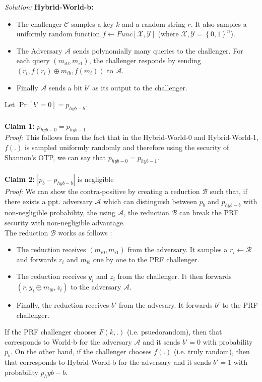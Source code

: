 \documentclass[a4paper, 11pt]{article}
\newenvironment{solution}
    {\textit{Solution:}}
    {\clearpage}
\newcommand{\bit}{\left\{0, 1\right\}}
\newcommand{\calA}{\mathcal{A}}
\newcommand{\calB}{\mathcal{B}}
\newcommand{\calC}{\mathcal{C}}
\newcommand{\calX}{\mathcal{X}}
\newcommand{\calY}{\mathcal{Y}}
\newcommand{\calR}{\mathcal{R}}
\begin{document}
\begin{solution}
    \textbf{Hybrid-World-b:}
    \begin{itemize}
        \item The challenger $\calC$ samples a key $k$ and a random string $r$. It also samples a uniformly random function $f \leftarrow Func[\calX, \calY]$ (where $\calX, \calY = \bit^n$).
        \item The Adversary $\calA$ sends polynomially many queries to the challenger. For each query $(m_{i0}, m_{i1})$, the challenger responds by sending $(r_i, f(r_i) \oplus m_{ib}, f(m_i))$ to $\calA$.
        \item Finally $\calA$ sends a bit $b'$ as its output to the challenger.
    \end{itemize}
    Let $\Pr[b' = 0] = p_{hyb-b}$. \\ \\
    \textbf{Claim 1:} $p_{hyb-0} = p_{hyb-1}$ \\
    \textit{Proof:} This follows from the fact that in the Hybrid-World-0 and Hybrid-World-1, $f(.)$ is sampled uniformly randomly and therefore using the security of Shannon's OTP, we can say that $p_{hyb-0} = p_{hyb-1}$.\\ \\
    \textbf{Claim 2:} $| p_{b} - p_{hyb-b} |$ is negligible \\
    \textit{Proof:} We can show the contra-positive by creating a reduction $\calB$ such that, if there exists a ppt. adversary $\calA$ which can distinguish between $p_{b}$ and $p_{hyb-b}$ with non-negligible probability, the using $\calA$, the reduction $\calB$ can break the PRF security with non-negligible advantage.\\
    The reduction $\calB$ works as follows :
    \begin{itemize}
        \item The reduction receives $(m_{i0}, m_{i1})$ from the adversary. It samples a $r_i \leftarrow \calR$ and forwards $r_i$ and $m_{ib}$ one by one to the PRF challenger.
        \item The reduction receives $y_i$ and $z_i$ from the challenger. It then forwards $(r, y_i \oplus m_{ib}, z_i)$ to the adversary $\calA$.
        \item Finally, the reduction receives $b'$ from the advesary. It forwards $b'$ to the PRF challenger.
    \end{itemize}
    If the PRF challenger chooses $F(k, .)$ (i.e. psuedorandom), then that corresponds to World-b for the adversary $\calA$ and it sends $b' = 0$ with probability $p_b$. On the other hand, if the challenger chooses $f(.)$ (i.e. truly random), then that corresponds to Hybrid-World-b for the adversary and it sends $b' = 1$ with probability $p_hyb-b$.

\end{solution}
\end{document}
